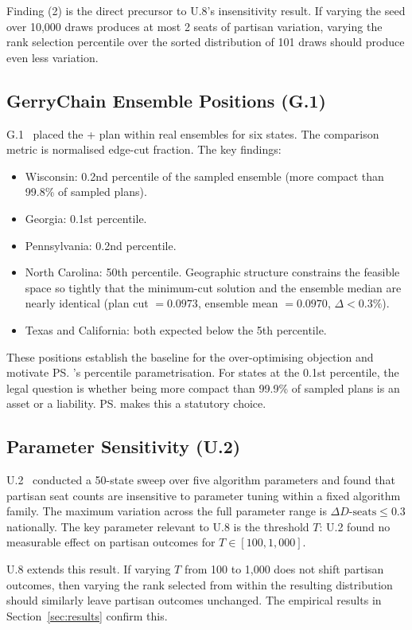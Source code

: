 Finding (2) is the direct precursor to U.8's insensitivity result.
If varying the seed over 10,000 draws produces at most 2 seats of partisan
variation, varying the rank selection percentile over the sorted distribution
of 101 draws should produce even less variation.

\subsection{GerryChain Ensemble Positions (G.1)}

G.1~\citep{g1paper} placed the \ar{} + \cs{} plan within real \gc{} \recom{}
ensembles for six states.
The comparison metric is normalised edge-cut fraction.
The key findings:
\begin{itemize}
\item Wisconsin: 0.2nd percentile of the sampled ensemble (more compact than
      99.8\% of sampled plans).
\item Georgia: 0.1st percentile.
\item Pennsylvania: 0.2nd percentile.
\item North Carolina: 50th percentile.
      Geographic structure constrains the feasible space so tightly that
      the minimum-cut solution and the ensemble median are nearly identical
      (plan cut $= 0.0973$, ensemble mean $= 0.0970$, $\Delta < 0.3\%$).
\item Texas and California: both expected below the 5th percentile.
\end{itemize}

These positions establish the baseline for the over-optimising objection and
motivate \ps{}'s percentile parametrisation.
For states at the 0.1st percentile, the legal question is whether being more
compact than 99.9\% of sampled plans is an asset or a liability.
\ps{} makes this a statutory choice.

\subsection{Parameter Sensitivity (U.2)}

U.2~\citep{b17paper} conducted a 50-state sweep over five algorithm
parameters and found that partisan seat counts are insensitive to parameter
tuning within a fixed algorithm family.
The maximum variation across the full parameter range is $\Delta
D\text{-seats} \leq 0.3$ nationally.
The key parameter relevant to U.8 is the \cs{} threshold $T$: U.2 found
no measurable effect on partisan outcomes for $T \in [100, 1{,}000]$.

U.8 extends this result.
If varying $T$ from 100 to 1,000 does not shift partisan outcomes, then
varying the rank selected from within the resulting distribution should
similarly leave partisan outcomes unchanged.
The empirical results in Section~\ref{sec:results} confirm this.
